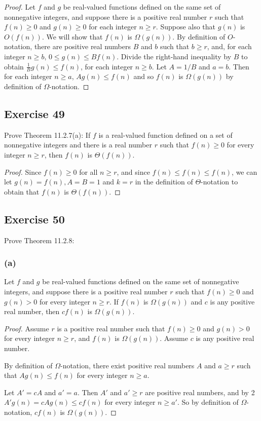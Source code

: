 \documentclass[14pt]{extarticle}
\newcommand{\dps}{\displaystyle}
\begin{document}
\begin{proof}
Let \(f\) and \(g\) be real-valued functions defined on the same set of nonnegative integers, and suppose there is a 
positive real number \(r\) such that \(f(n) \geq 0\) and \(g(n) \geq 0\) for each integer \(n \geq r\). Suppose also 
that \(g(n)\) is \(O(f(n))\). We will show that \(f(n)\) is \(\Omega(g(n))\). By definition of \(O\)-notation, there are 
positive real numbers \(B\) and \(b\) such that \(b \geq r\), and, for each integer \(n \geq b\), \(0 \leq g(n)\leq Bf(n)\). 
Divide the right-hand inequality by \(B\) to obtain \(\dps \frac{1}{B} g(n) \leq f(n)\), for each integer \(n \geq b\). 
Let \(A = 1/B\) and \(a = b\). Then for each integer \(n \geq a\), \(Ag(n) \leq f(n)\) and so \(f(n)\) is \(\Omega(g(n))\) 
by definition of \(\Omega\)-notation.
\end{proof}

\subsection{Exercise 49}
Prove Theorem 11.2.7(a): If \(f\) is a real-valued function defined on a set of nonnegative integers and there is a real 
number \(r\) such that \(f(n) \geq 0\) for every integer \(n \geq r\), then \(f(n)\) is \(\Theta(f(n))\).

\begin{proof}
Since \(f(n) \geq 0\) for all \(n \geq r\), and since \(f(n) \leq f(n) \leq f(n)\), we can let \(g(n) = f(n), A = B = 1\)
and \(k = r\) in the definition of \(\Theta\)-notation to obtain that \(f(n)\) is \(\Theta(f(n))\).
\end{proof}

\subsection{Exercise 50}
Prove Theorem 11.2.8:

\subsubsection{(a)}
Let \(f\) and \(g\) be real-valued functions defined on the same set of nonnegative integers, and suppose there is a 
positive real number \(r\) such that \(f(n) \geq 0\) and \(g(n) > 0\) for every integer \(n \geq r\). If \(f(n)\) is 
\(\Omega(g(n))\) and \(c\) is any positive real number, then \(cf(n)\) is \(\Omega(g(n))\).

\begin{proof}
Assume \(r\) is a positive real number such that \(f(n) \geq 0\) and \(g(n) > 0\) for every integer \(n \geq r\), and 
\(f(n)\) is \(\Omega(g(n))\). Assume \(c\) is any positive real number.

By definition of \(\Omega\)-notation, there exist positive real numbers \(A\) and \(a \geq r\) such that \(Ag(n) \leq 
f(n)\) for every integer \(n \geq a\).

Let \(A' = cA\) and \(a' = a\). Then \(A'\) and \(a' \geq r\) are positive real numbers, and by 2 \(A'g(n) = cAg(n) \leq 
cf(n)\) for every integer \(n \geq a'\). So by definition of \(\Omega\)-notation, \(cf(n)\) is \(\Omega(g(n))\).
\end{proof}
\end{document}
